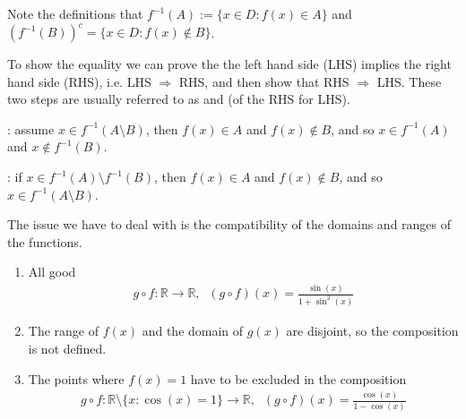 \documentclass[letterpaper,10pt,english]{jupyterBook}
\begin{document}
\sphinxAtStartPar
{}

\sphinxAtStartPar
Note the definitions that \(f^{-1}(A) := \{x\in D\colon f(x) \in A \}\) and \((f^{-1}(B))^c = \{x\in D\colon f(x) ∉  B\}\).

\sphinxAtStartPar
To show the equality we can prove the the left hand side (LHS) implies the right hand side (RHS), i.e. LHS \(\Rightarrow\) RHS, and then show that RHS \(\Rightarrow\) LHS. These two steps are usually referred to as
 and  (of the RHS for LHS).

\sphinxAtStartPar
{}: assume \(x \in f^{-1}(A \setminus B)\), then \(f(x) \in A\) and \(f(x) \notin B\), and so \(x \in f^{-1}(A)\) and \(x \notin f^{-1}(B)\).

\sphinxAtStartPar
{}: if \(x \in f^{-1}(A) \setminus f^{-1}(B)\), then \(f(x) \in A\) and \(f(x) \notin B\), and so \(x \in f^{-1}(A \setminus B)\).

\sphinxAtStartPar
{}

\sphinxAtStartPar
The issue we have to deal with is the compatibility of the domains and ranges of the functions.
\begin{enumerate}
%
\item {} 
\sphinxAtStartPar
All good
\begin{equation*}
\begin{split}
   g \circ f \colon \mathbb{R} \rightarrow \mathbb{R}, \;\; (g \circ f)(x) = \frac{\sin(x)}{1+\sin^2(x)}
   \end{split}
\end{equation*}
\item {} 
\sphinxAtStartPar
The range of \(f(x)\) and the domain of \(g(x)\) are disjoint, so the composition is not defined.

\item {} 
\sphinxAtStartPar
The points where \(f(x)=1\) have to be excluded in the composition
\begin{equation*}
\begin{split}
   g \circ f \colon \mathbb{R}\setminus\{x: \cos(x)=1\} \rightarrow \mathbb{R}, \;\; (g \circ f)(x) = \frac{\cos(x)}{1-\cos(x)}
   \end{split}
\end{equation*}
\end{enumerate}
\end{document}
